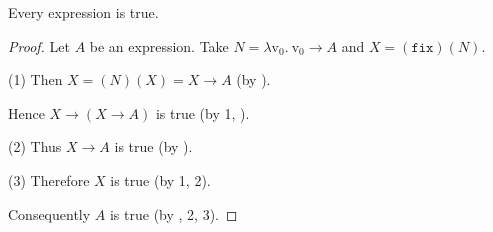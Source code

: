 \documentclass{article}
\newcommand{\var}[1]{\textrm{v}_{#1}}
\newcommand{\abs}[2]{\lambda\var{#1}.\ #2}
\newcommand{\app}[2]{(#1)(#2)}
\newcommand{\fix}{\texttt{fix}}
\begin{document}
  \begin{forthel}
    \begin{theorem*}\label{curry_paradox}
      Every expression is true.
    \end{theorem*}
    \begin{proof}
      Let $A$ be an expression.
      Take $N = \abs{0}{\var{0} \rightarrow A}$ and $X = \app{\fix}{N}.$
  
      (1) Then $X = \app{N}{X} = X \rightarrow A$ (by ).
  
      Hence $X \rightarrow (X \rightarrow A)$ is true (by 1, ).
  
      (2) Thus $X \rightarrow A$ is true (by ).
  
      (3) Therefore $X$ is true (by 1, 2).
  
      Consequently $A$ is true (by , 2, 3).
    \end{proof}
  \end{forthel}

  \printbibliography
\end{document}
